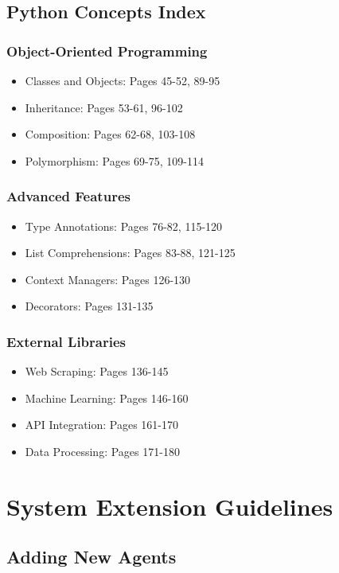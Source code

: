 \documentclass[12pt,twoside,openright]{book}
\begin{document}
\section{Python Concepts Index}

\subsection{Object-Oriented Programming}
\begin{itemize}
    \item Classes and Objects: Pages 45-52, 89-95
    \item Inheritance: Pages 53-61, 96-102  
    \item Composition: Pages 62-68, 103-108
    \item Polymorphism: Pages 69-75, 109-114
\end{itemize}

\subsection{Advanced Features}
\begin{itemize}
    \item Type Annotations: Pages 76-82, 115-120
    \item List Comprehensions: Pages 83-88, 121-125
    \item Context Managers: Pages 126-130
    \item Decorators: Pages 131-135
\end{itemize}

\subsection{External Libraries}
\begin{itemize}
    \item Web Scraping: Pages 136-145
    \item Machine Learning: Pages 146-160
    \item API Integration: Pages 161-170
    \item Data Processing: Pages 171-180
\end{itemize}

\chapter{System Extension Guidelines}

\section{Adding New Agents}
\end{document}
